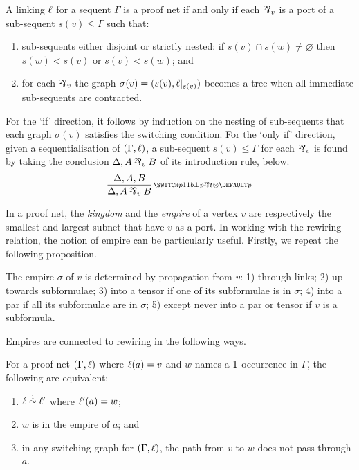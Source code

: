 \documentclass[conference]{IEEEtran}
\begin{document}
\begin{proposition}
\label{prop:scoping correctness}
A linking $\ell$ for a sequent $\Gamma$ is a proof net if and only if each $\named v\parr$ is a port of a sub-sequent $s(v)\leq\Gamma$ such that:

\begin{enumerate}
	\item
sub-sequents either disjoint or strictly nested: if $s(v)\cap s(w)\neq\varnothing$ then $s(w)<s(v)$ or $s(v)<s(w)$; and
	\item
for each $\named v\parr$ the graph $\sigma(v)=(s(v),\ell|_{s(v)})$ becomes a tree when all immediate sub-sequents are contracted.
\end{enumerate}
%
\end{proposition}


\begin{IEEEproof}
For the `if' direction, it follows by induction on the nesting of sub-sequents that each graph $\sigma(v)$ satisfies the switching condition.
%
For the `only if' direction, given a sequentialisation of $(\Gamma,\ell)$, a sub-sequent $s(v)\leq\Gamma$ for each $\named v\parr$ is found by taking the conclusion $\Delta, A\named v\parr B$ of its introduction rule, below.
\[
	\infer[\MLLlabel p]{\Delta,A\named v\parr B}{\Delta,A,B}
\]
\vskip-12pt
\end{IEEEproof}



In a proof net, the \emph{kingdom} and the \emph{empire} of a vertex $v$ are respectively the smallest and largest subnet that have $v$ as a port.
%
In working with the rewiring relation, the notion of empire can be particularly useful.
%
Firstly, we repeat the following proposition.


\begin{proposition}
\label{prop:empire propagation}
The empire $\sigma$ of $v$ is determined by propagation from $v$: 1) through links; 2) up towards subformulae; 3) into a tensor if one of its subformulae is in $\sigma$; 4) into a par if all its subformulae are in $\sigma$; 5) except never into a par or tensor if $v$ is a subformula.
\end{proposition}


Empires are connected to rewiring in the following ways.


\begin{lemma}
\label{lem:rewiring within empire}
For a proof net $(\Gamma,\ell)$ where $\ell(a)=v$ and $w$ names a $1$-occurrence in $\Gamma$, the following are equivalent:
%
\begin{enumerate}
	\item
$\links\perm*\links'$ where $\ell'(a)=w$;
	\item
$w$ is in the empire of $a$; and
	\item
in any switching graph for $(\Gamma,\ell)$, the path from $v$ to $w$ does not pass through $a$.
\end{enumerate}
\end{lemma}
\end{document}
